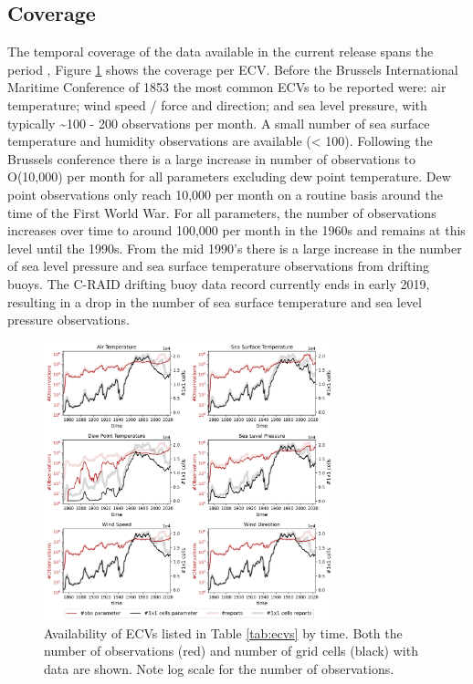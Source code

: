 \subsection{Coverage}
The temporal coverage of the data available in the current release spans the period \datatimerange{}, Figure \ref{fig:ecv_ts1} shows the coverage per ECV. 
Before the Brussels International Maritime Conference of 1853 the most common ECVs to be reported were: air temperature; wind speed / force and direction; and sea level pressure, with typically \sim 100 - 200 observations per month. 
A small number of sea surface temperature and humidity observations are available (< 100).
Following the Brussels conference there is a large increase in number of observations to O(10,000) per month for all parameters excluding dew point temperature. 
Dew point observations only reach 10,000 per month on a routine basis around the time of the First World War.
For all parameters, the number of observations increases over time to around 100,000 per month in the 1960s and remains at this level until the 1990s.
From the mid 1990's there is a large increase in the number of sea level pressure and sea surface temperature observations from drifting buoys.
The C-RAID drifting buoy data record currently ends in early 2019, resulting in a drop in the number of sea surface temperature and sea level pressure observations.

\begin{figure}[h]
\centering
    \includegraphics[width=0.75\textwidth]{resources/ecv_coverage_ts_grid.png}
    \caption{Availability of ECVs listed in Table \ref{tab:ecvs} by time. Both the number of observations (red) and number of grid cells (black) with data are shown. Note log scale for the number of observations.\\}
    \label{fig:ecv_ts1}
\end{figure}


